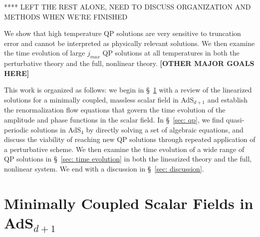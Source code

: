 \documentclass[../PhD.tex]{subfiles}
\begin{document}
****
LEFT THE REST ALONE, NEED TO DISCUSS ORGANIZATION AND METHODS WHEN WE'RE FINISHED

We show that high temperature QP solutions are very sensitive to truncation error and cannot be interpreted as physically relevant solutions. We then examine the time evolution of large $j_{max}$ QP solutions at all temperatures in both the perturbative theory and the full, nonlinear theory. {\bf [OTHER MAJOR GOALS HERE]}

This work is organized as follows: we begin in \S~\!\ref{sec: scalar in AdS} with a review of the linearized solutions for a minimally coupled, massless scalar field in AdS$_{d+1}$ and establish the renormalization flow equations that govern the time evolution of the amplitude and phase functions in the scalar field. In \S~\!\ref{sec: qp}, we find quasi-periodic solutions in AdS$_4$ by directly solving a set of algebraic equations, and discuss the viability of reaching new QP solutions through repeated application of a perturbative scheme. We then examine the time evolution of a wide range of QP solutions in \S\!~\ref{sec: time evolution} in both the linearized theory and the full, nonlinear system. We end with a discussion in \S~\!\ref{sec: discussion}. 



\section{Minimally Coupled Scalar Fields in AdS$_{d+1}$}
\label{sec: scalar in AdS}
\end{document}
